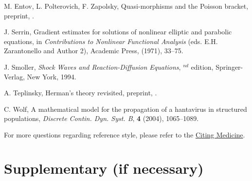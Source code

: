 \documentclass{aims}
\numberwithin{equation}{section}
\begin{document}
\begin{thebibliography}{99}
\newblock M. Entov, L. Polterovich, F. Zapolsky,
\newblock Quasi-morphisms and the Poisson bracket,
\newblock preprint, .

    \newblock J. Serrin,
    \newblock  Gradient estimates for solutions of nonlinear elliptic
                     and parabolic equations,
    \newblock  in \emph{Contributions to Nonlinear Functional Analysis} (eds. E.H. Zarantonello and Author 2),
                Academic Press, (1971), 33--75.

     \newblock J.  Smoller,
     \newblock \emph{Shock Waves and Reaction-Diffusion Equations},
     $^{nd}$ edition,  Springer-Verlag, New York, 1994.

\newblock A. Teplinsky,
\newblock Herman's theory revisited, preprint,
\newblock {}.

     \newblock C.  Wolf,
     \newblock A mathematical model for the propagation of a hantavirus in structured populations,
     \newblock \emph{Discrete Contin. Dyn. Syst. B}, \textbf{4} (2004), 1065--1089.

\end{thebibliography}


For more questions regarding reference style, please refer to the \href{http://www.ncbi.nlm.nih.gov/books/NBK7256/}{Citing Medicine}.

\section*{Supplementary (if necessary)}
\end{document}
